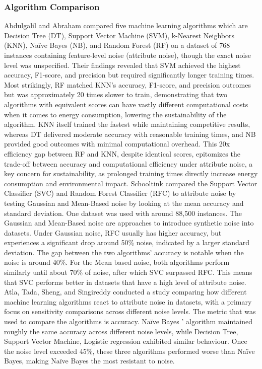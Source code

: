 \documentclass[conference]{IEEEtran}
\begin{document}
\subsubsection*{Algorithm Comparison}
Abdulgalil and Abraham \cite{abduljalil} compared five machine learning algorithms which are Decision Tree (DT), Support Vector Machine (SVM), k-Nearest Neighbors (KNN), Naïve Bayes (NB), and Random Forest (RF) on a dataset of 768 instances containing feature-level noise (attribute noise), though the exact noise level was unspecified. Their findings revealed that SVM achieved the highest accuracy, F1-score, and precision but required significantly longer training times. Most strikingly, RF matched KNN’s accuracy, F1-score, and precision outcomes but was approximately 20 times slower to train, demonstrating that two algorithms with equivalent scores can have vastly different computational costs when it comes to energy consumption, lowering the sustainability of the algorithm. KNN itself trained the fastest while maintaining competitive results, whereas DT delivered moderate accuracy with reasonable training times, and NB provided good outcomes with minimal computational overhead. This 20x efficiency gap between RF and KNN, despite identical scores, epitomizes the trade-off between accuracy and computational efficiency under attribute noise, a key concern for sustainability, as prolonged training times directly increase energy consumption and environmental impact.
\newline
\newline 
Schooltink \cite{schooltink} compared the Support Vector Classifier (SVC) and Random Forest Classifier (RFC) to attribute noise by testing Gaussian and Mean-Based noise by looking at the mean accuracy and standard deviation. One dataset was used with around 88,500 instances. The Gaussian and Mean-Based noise are approaches to introduce synthetic noise into datasets. Under Gaussian noise, RFC usually has higher accuracy, but experiences a significant drop around 50\% noise, indicated by a larger standard deviation. The gap between the two algorithms' accuracy is notable when the noise is around 40\%. For the Mean based noise, both algorithms perform similarly until about 70\% of noise, after which SVC surpassed RFC. This means that SVC performs better in datasets that have a high level of attribute noise. 
\newline
\newline
Atla, Tada, Sheng, and Singireddy \cite{atla2011} conducted a study comparing how different machine learning algorithms react to attribute noise in datasets, with a primary focus on sensitivity comparisons across different noise levels. The metric that was used to compare the algorithms is accuracy. Naïve Bayes ' algorithm maintained roughly the same accuracy across different noise levels, while Decision Tree, Support Vector Machine, Logistic regression exhibited similar behaviour. Once the noise level exceeded 45\%, these three algorithms performed worse than Naïve Bayes, making Naïve Bayes the most resistant to noise.
\end{document}
